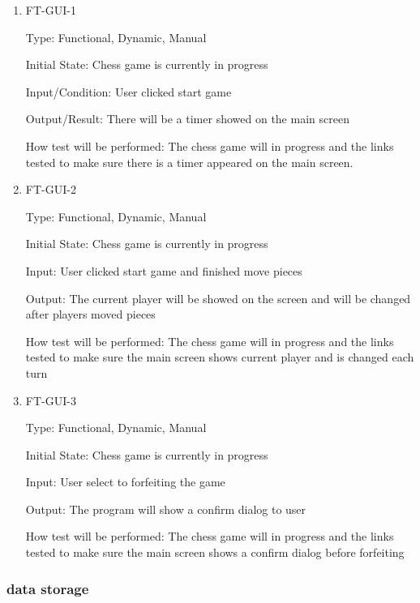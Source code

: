 \documentclass[12pt, titlepage]{article}
\begin{document}
\begin{enumerate}

\item{FT-GUI-1\\}

Type: Functional, Dynamic, Manual
					
Initial State: Chess game is currently in progress
					
Input/Condition: User clicked start game
					
Output/Result: There will be a timer showed on the main screen
					
How test will be performed: The chess game will in progress and the links tested to make sure there is a timer appeared on the main screen. 

\item{FT-GUI-2\\}

Type: Functional, Dynamic, Manual
					
Initial State: Chess game is currently in progress
					
Input: User clicked start game and finished move pieces
					
Output: The current player will be showed on the screen and will be changed after players moved pieces
					
How test will be performed: The chess game will in progress and the links tested to make sure the main screen shows current player and is changed each turn

\item{FT-GUI-3\\}

Type: Functional, Dynamic, Manual
					
Initial State: Chess game is currently in progress
					
Input: User select to forfeiting the game
					
Output: The program will show a confirm dialog to user
					
How test will be performed: The chess game will in progress and the links tested to make sure the main screen shows a confirm dialog before forfeiting

\end{enumerate}

\subsubsection{data storage}
\end{document}
